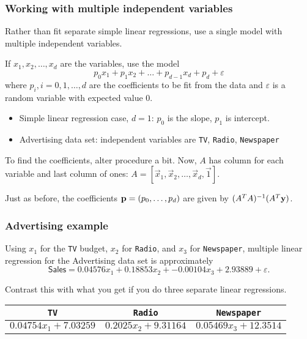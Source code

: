 \documentclass{beamer}
\theoremstyle{example}
\newcommand{\ttt}[1]{{\small\texttt{#1}}}
\begin{document}
\begin{frame}
\frametitle{Working with multiple independent variables}
    Rather than fit separate simple linear regressions, use a single model with multiple independent variables. 
\pause

    If $x_1,x_2,\ldots,x_d$ are the variables, use the model 
    \[p_0x_1 + p_1x_2 + \ldots + p_{d-1}x_d + p_d + \varepsilon\]
    where $p_i, i=0,1,\ldots,d$ are the coefficients to be fit from the data and $\varepsilon$ is a random variable with expected value 0.
    \begin{itemize}
        \item Simple linear regression case, $d=1$: $p_0$ is the slope, $p_1$ is intercept.
        \item Advertising data set: independent variables are \ttt{TV}, \ttt{Radio}, \ttt{Newspaper}
    \end{itemize}

\pause
    To find the coefficients, alter procedure a bit. Now, $A$ has column for each variable and last column of ones: $A = [\vec{x}_1, \vec{x}_2, \ldots, \vec{x}_d, \vec{1}]$.

    Just as before, the coefficients ${\bf p} = (p_0,\ldots, p_d)$ are given by $(A^TA)^{-1}(A^T{\bf y})$.

\end{frame}

\begin{frame}
\frametitle{Advertising example}
    Using $x_1$ for the \ttt{TV} budget, $x_2$ for \ttt{Radio}, and $x_3$ for \ttt{Newspaper}, multiple linear regression for the Advertising data set is approximately 
        \[\textsf{Sales} = 0.04576x_1 + 0.18853x_2 + -0.00104x_3 + 2.93889 + \varepsilon.\]
    
    Contrast this with what you get if you do three separate linear regressions.
    \centering
    \begin{tabular}{c c c}
        \ttt{TV} & \ttt{Radio} & \ttt{Newspaper} \\ 
        \hline 
        $0.04754x_1 + 7.03259$ & $0.2025x_2 + 9.31164$ & $0.05469x_3 + 12.3514$
    \end{tabular}

\end{frame}
\end{document}
